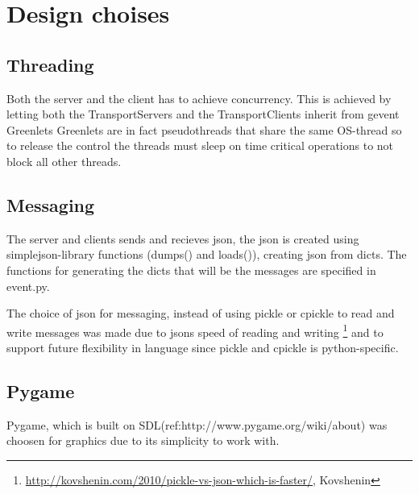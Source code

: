 \section{Design choises}



\subsection{Threading}
\label{sec:threading}

Both the server and the client has to achieve concurrency. This is achieved by letting both the TransportServers and the TransportClients inherit from gevent Greenlets %
Greenlets are in fact pseudothreads %
that share the same OS-thread so to release the control the threads must sleep on time critical operations to not block all other threads. 


\subsection{Messaging}
The server and clients sends and recieves json, the json is created using simplejson-library functions (dumps() and loads()), creating json from dicts. The functions for generating the dicts that will be the messages are specified in event.py. 

The choice of json for messaging, instead of using pickle or cpickle to read and write messages was made due to jsons speed of reading and writing \footnote{\url{http://kovshenin.com/2010/pickle-vs-json-which-is-faster/}, Kovshenin} and to support future flexibility in language since pickle and cpickle is python-specific. 

\subsection{Pygame}

Pygame, which is built on SDL(ref:http://www.pygame.org/wiki/about) was choosen for graphics due to its simplicity to work with. 



